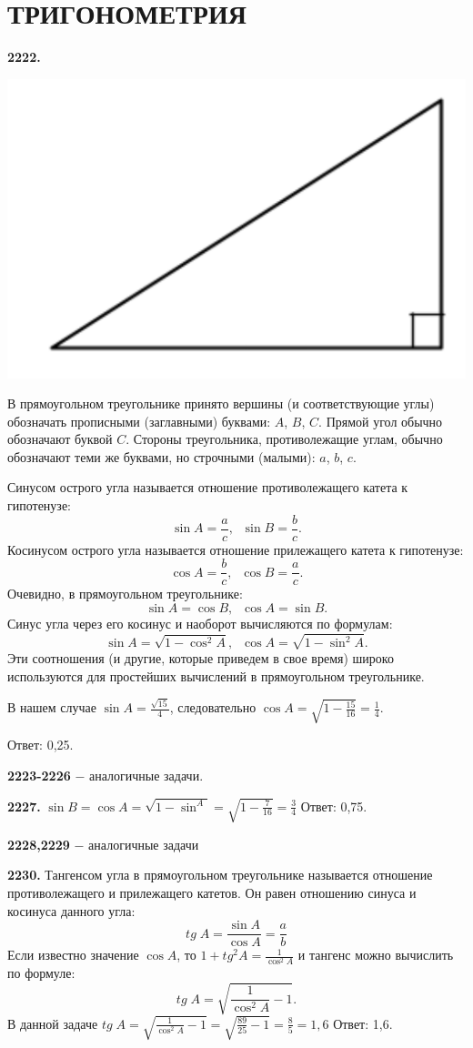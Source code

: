 \section{ТРИГОНОМЕТРИЯ}

\textbf{2222.}

{\centering \includegraphics[width=0.35\linewidth]{Geometry/Content/51.png}
	
}

В прямоугольном треугольнике принято вершины (и соответствующие углы) обозначать прописными (заглавными) буквами: $A$, $B$, $C$. Прямой угол обычно обозначают буквой $C$. Стороны треугольника, противолежащие углам, обычно обозначают теми же буквами, но строчными (малыми): $a$, $b$, $c$.

Синусом острого угла называется отношение противолежащего катета к гипотенузе:
\[
\sin{A} = \frac{a}{c}, \;\; \sin{B}=\frac{b}{c}.
\]
Косинусом острого угла называется отношение прилежащего катета к гипотенузе:
\[
\cos{A} = \frac{b}{c}, \;\; \cos{B}=\frac{a}{c}.
\]
Очевидно, в прямоугольном треугольнике:
\[
\sin{A} = \cos{B}, \;\; \cos{A} = \sin{B}.
\]
Синус угла через его косинус и наоборот вычисляются по формулам:
\[
\sin{A} = \sqrt{1-\cos^2{A}}, \;\; \cos{A} = \sqrt{1 - \sin^2{A}}.
\]
 Эти соотношения (и другие, которые приведем в свое время) широко используются для простейших вычислений в прямоугольном треугольнике.
 
 В нашем случае  $\sin{A} = \frac{\sqrt{15}}{4}$, следовательно $\cos{A}=\sqrt{1 - \frac{15}{16}}=\frac{1}{4}.$ 
 
 \null \hspace*{\fill} Ответ: 0,25.
 
 \textbf{2223-2226} $-$ аналогичные задачи.
 
 \textbf{2227.} $\sin{B} = \cos{A} = \sqrt{1-\sin^{A}}=\sqrt{1-\frac{7}{16}}=\frac{3}{4}$ \newline \null \hspace*{\fill} Ответ: 0,75.
 
 \textbf{2228,2229} $-$ аналогичные задачи
 
 \textbf{2230.} Тангенсом угла в прямоугольном треугольнике называется отношение противолежащего и прилежащего катетов. Он равен отношению синуса и косинуса данного угла:
 \[
 tg\;A = \frac{\sin{A}}{\cos{A}} = \frac{a}{b}
 \]
 Если известно значение $\cos{A}$, то $1+tg^2A=\frac{1}{\cos^2{A}}$ и тангенс можно вычислить по формуле:
 \[
 tg\;A=\sqrt{\frac{1}{\cos^2{A}} - 1}.
 \]
 В данной задаче $tg\;A=\sqrt{\frac{1}{\cos^2{A}} - 1} = \sqrt{\frac{89}{25} - 1} = \frac{8}{5}=1,6$ \newline \null \hspace*{\fill} Ответ: 1,6.
 

